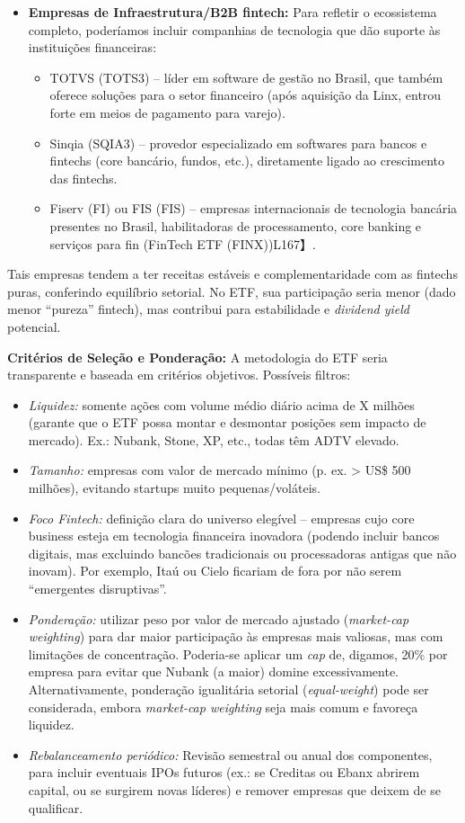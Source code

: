 \documentclass[12pt]{article}
\begin{document}
\begin{itemize}
\item \textbf{Empresas de Infraestrutura/B2B fintech:} Para refletir o ecossistema completo, poderíamos incluir companhias de tecnologia que dão suporte às instituições financeiras:
\begin{itemize}
\item TOTVS (TOTS3) – líder em software de gestão no Brasil, que também oferece soluções para o setor financeiro (após aquisição da Linx, entrou forte em meios de pagamento para varejo).
\item Sinqia (SQIA3) – provedor especializado em softwares para bancos e fintechs (core bancário, fundos, etc.), diretamente ligado ao crescimento das fintechs.
\item Fiserv (FI) ou FIS (FIS) – empresas internacionais de tecnologia bancária presentes no Brasil, habilitadoras de processamento, core banking e serviços para fin (FinTech ETF (FINX))L167】.
\end{itemize}
\end{itemize}

Tais empresas tendem a ter receitas estáveis e complementaridade com as fintechs puras, conferindo equilíbrio setorial. No ETF, sua participação seria menor (dado menor “pureza” fintech), mas contribui para estabilidade e \textit{dividend yield} potencial.

\textbf{Critérios de Seleção e Ponderação:} A metodologia do ETF seria transparente e baseada em critérios objetivos. Possíveis filtros:
\begin{itemize}
\item \textit{Liquidez:} somente ações com volume médio diário acima de X milhões (garante que o ETF possa montar e desmontar posições sem impacto de mercado). Ex.: Nubank, Stone, XP, etc., todas têm ADTV elevado.
\item \textit{Tamanho:} empresas com valor de mercado mínimo (p. ex. > US\$ 500 milhões), evitando startups muito pequenas/voláteis.
\item \textit{Foco Fintech:} definição clara do universo elegível – empresas cujo core business esteja em tecnologia financeira inovadora (podendo incluir bancos digitais, mas excluindo bancões tradicionais ou processadoras antigas que não inovam). Por exemplo, Itaú ou Cielo ficariam de fora por não serem “emergentes disruptivas”.
\item \textit{Ponderação:} utilizar peso por valor de mercado ajustado (\textit{market-cap weighting}) para dar maior participação às empresas mais valiosas, mas com limitações de concentração. Poderia-se aplicar um \textit{cap} de, digamos, 20\% por empresa para evitar que Nubank (a maior) domine excessivamente. Alternativamente, ponderação igualitária setorial (\textit{equal-weight}) pode ser considerada, embora \textit{market-cap weighting} seja mais comum e favoreça liquidez.
\item \textit{Rebalanceamento periódico:} Revisão semestral ou anual dos componentes, para incluir eventuais IPOs futuros (ex.: se Creditas ou Ebanx abrirem capital, ou se surgirem novas líderes) e remover empresas que deixem de se qualificar.
\end{itemize}
\end{document}

